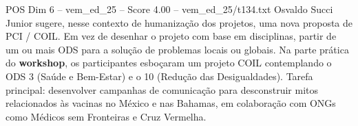 \begin{textsample}{POS Dim 6 – vem\_ed\_25 – Score 4.00 – vem\_ed\_25/t134.txt}
Osvaldo Succi Junior sugere, nesse contexto de humanização dos projetos, uma nova proposta de PCI / COIL.
Em vez de desenhar o projeto com base em disciplinas, partir de um ou mais ODS para a solução de problemas locais ou globais.
Na parte prática do \textbf{workshop}, os participantes esboçaram um projeto COIL contemplando o ODS 3 (Saúde e Bem-Estar) e o 10 (Redução das Desigualdades).
Tarefa principal: desenvolver campanhas de comunicação para desconstruir mitos relacionados às vacinas no México e nas Bahamas, em colaboração com ONGs como Médicos sem Fronteiras e Cruz Vermelha.

\end{textsample}
